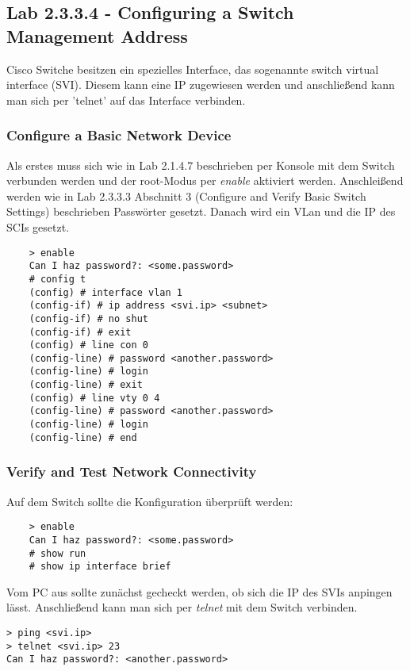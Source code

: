 \subsection{Lab 2.3.3.4 - Configuring a Switch Management Address}

Cisco Switche besitzen ein spezielles Interface, das sogenannte switch virtual interface (SVI). Diesem kann eine IP zugewiesen werden und anschließend kann man sich per 'telnet' auf das Interface verbinden.

\subsubsection{Configure a Basic Network Device}

Als erstes muss sich wie in Lab 2.1.4.7 beschrieben per Konsole mit dem Switch verbunden werden und der root-Modus per {\it enable} aktiviert werden. Anschleißend werden wie in Lab 2.3.3.3 Abschnitt 3 (Configure and Verify Basic Switch Settings) beschrieben Passwörter gesetzt. Danach wird ein VLan und die IP des SCIs gesetzt.

\begin{lstlisting}
	> enable
	Can I haz password?: <some.password>
	# config t
	(config) # interface vlan 1
	(config-if) # ip address <svi.ip> <subnet>
	(config-if) # no shut
	(config-if) # exit
	(config) # line con 0
	(config-line) # password <another.password>
	(config-line) # login
	(config-line) # exit
	(config) # line vty 0 4
	(config-line) # password <another.password>
	(config-line) # login
	(config-line) # end
\end{lstlisting}

\subsubsection{Verify and Test Network Connectivity}
Auf dem Switch sollte die Konfiguration überprüft werden:

\begin{lstlisting}
	> enable
	Can I haz password?: <some.password>
	# show run
	# show ip interface brief
\end{lstlisting}

\noindent Vom PC aus sollte zunächst gecheckt werden, ob sich die IP des SVIs anpingen lässt. Anschließend kann man sich per {\it telnet} mit dem Switch verbinden.

\indent	\verb+> ping <svi.ip>+\\
\indent	\verb+> telnet <svi.ip> 23+\\
\indent	\verb+Can I haz password?: <another.password>+\\
	

